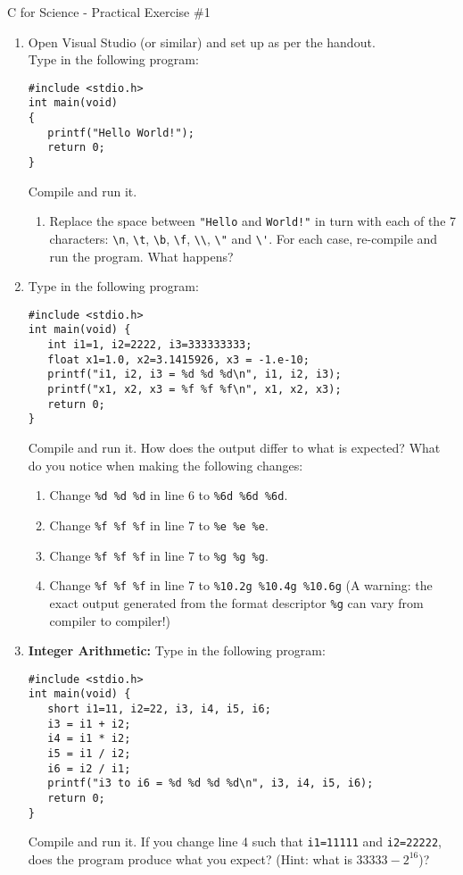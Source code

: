 \documentclass[a4paper,12pt]{article}
\begin{document}
\begin{center}
\large C for Science - Practical Exercise \#1
\end{center}

\begin{enumerate}
\item Open Visual Studio (or similar) and set up as per the handout. \\
Type in the following program:
\begin{verbatim}
#include <stdio.h>
int main(void)
{
   printf("Hello World!");
   return 0;
}
\end{verbatim}
Compile and run it.
\begin{enumerate}
\item Replace the space between \verb|"Hello| and \verb|World!"| in turn with each of the 7 characters: \verb|\n|, \verb|\t|, \verb|\b|, \verb|\f|, \verb|\\|, \verb|\"| and \verb|\'|. For each case, re-compile and run the program.
What happens?
\end{enumerate}

\item Type in the following program:
\begin{verbatim}
#include <stdio.h>
int main(void) {
   int i1=1, i2=2222, i3=333333333;
   float x1=1.0, x2=3.1415926, x3 = -1.e-10;
   printf("i1, i2, i3 = %d %d %d\n", i1, i2, i3);
   printf("x1, x2, x3 = %f %f %f\n", x1, x2, x3);
   return 0;
}
\end{verbatim}
Compile and run it. How does the output differ to what is expected? What do you notice when making the following changes:
\begin{enumerate}
\item Change \verb|%d %d %d| in line 6 to \verb|%6d %6d %6d|.
\item Change \verb|%f %f %f| in line 7 to \verb|%e %e %e|.
\item Change \verb|%f %f %f| in line 7 to \verb|%g %g %g|.
\item Change \verb|%f %f %f| in line 7 to \verb|%10.2g %10.4g %10.6g| (A warning: the exact output generated from the format descriptor \verb|%g| can vary from compiler to compiler!)
\end{enumerate}

\item {\bf Integer Arithmetic:} Type in the following program:
\begin{verbatim}
#include <stdio.h>
int main(void) {
   short i1=11, i2=22, i3, i4, i5, i6;
   i3 = i1 + i2;
   i4 = i1 * i2;
   i5 = i1 / i2;
   i6 = i2 / i1;
   printf("i3 to i6 = %d %d %d %d\n", i3, i4, i5, i6);
   return 0;
}
\end{verbatim}
Compile and run it. If you change line 4 such that \verb|i1=11111| and \verb|i2=22222|, does the program produce what you expect? (Hint: what is $33333-2^{16}$)?


\end{enumerate}
\end{document}
